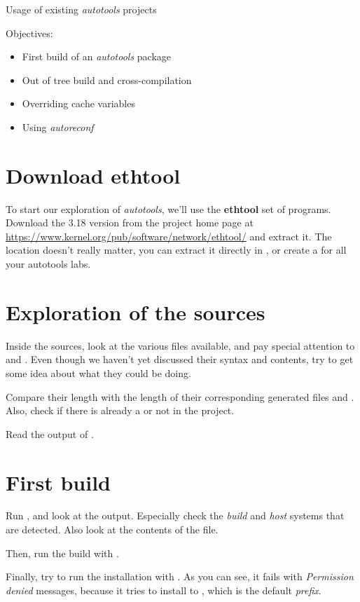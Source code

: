 \subchapter
{Usage of existing {\em autotools} projects}
{Objectives:
  \begin{itemize}
  \item First build of an {\em autotools} package
  \item Out of tree build and cross-compilation
  \item Overriding cache variables
  \item Using {\em autoreconf}
  \end{itemize}
}

\section{Download ethtool}

To start our exploration of {\em autotools}, we'll use the {\bf
  ethtool} set of programs. Download the 3.18 version from the project
home page at
\url{https://www.kernel.org/pub/software/network/ethtool/} and extract
it. The location doesn't really matter, you can extract it directly in
, or create a  for all your
autotools labs.

\section{Exploration of the sources}

Inside the sources, look at the various files available, and pay
special attention to  and . Even
though we haven't yet discussed their syntax and contents, try to get
some idea about what they could be doing.

Compare their length with the length of their corresponding generated
files  and . Also, check if there is
already a  or not in the project.

Read the output of .

\section{First build}

Run , and look at the output. Especially check the
{\em build} and {\em host} systems that are detected. Also look at the
contents of the  file.

Then, run the build with .

Finally, try to run the installation with . As you
can see, it fails with {\em Permission denied} messages, because it
tries to install to , which is the default {\em
  prefix}.

